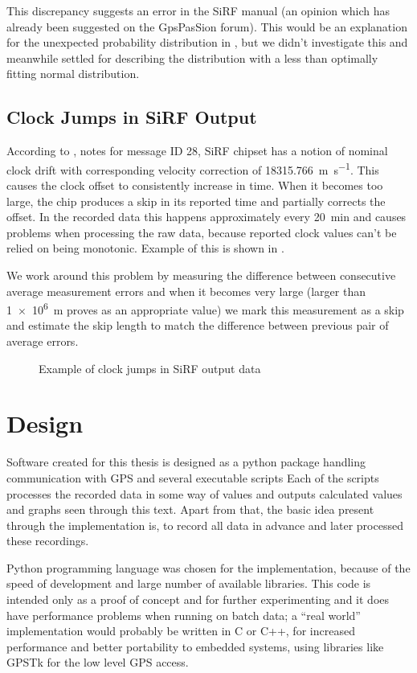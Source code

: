This discrepancy suggests an error in the SiRF manual (an opinion which has already been
suggested on the GpsPasSion forum).
This would be an explanation for the unexpected probability distribution in
, but we didn't investigate this and meanwhile
settled for describing the distribution with a less than optimally fitting normal distribution.

\subsection{Clock Jumps in SiRF Output}
\label{sec:impl-sirf-jumps}
According to \cite{sirf-protocol}, notes for message ID 28, SiRF chipset has a
notion of nominal clock drift with corresponding velocity correction of \SI{18315.766}{\meter\per\second}.
This causes the clock offset to consistently increase in time.
When it becomes too large, the chip produces a skip in its reported time and
partially corrects the offset.
In the recorded data this happens approximately every \SI{20}{\minute} and causes
problems when processing the raw data, because reported clock values
can't be relied on being monotonic.
Example of this is shown in .

We work around this problem by measuring the difference between consecutive average
measurement errors and when it becomes very large (larger than \SI{1e6}{\meter} proves as an
appropriate value) we mark this measurement as a skip and estimate the skip
length to match the difference between previous pair of average errors.

\begin{figure}[tp]
	\centering
	\noindent{}
	\caption{Example of clock jumps in SiRF output data}
	\label{fig:impl-clock-jumps}
\end{figure}

\section{Design}
Software created for this thesis is designed as a python package handling communication
with GPS and several executable scripts
Each of the scripts processes the recorded data in some way of values and
outputs calculated values and graphs seen through this text.
Apart from that, the basic idea present through the implementation is, to record
all data in advance and later processed these recordings.

Python programming language was chosen for the implementation,
because of the speed of development and large number of available libraries.
This code is intended only as a proof of
concept and for further experimenting and it does have performance problems
when running on batch data; a \enquote{real world} implementation
would probably be written in C or C++, for increased performance and better portability
to embedded systems, using libraries like GPSTk \cite{tolman04} for the low level GPS access.

